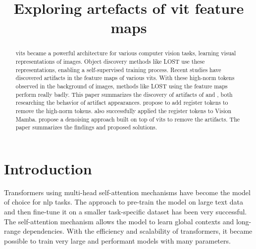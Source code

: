\documentclass[conference]{IEEEtran}
\begin{document}
  \title{Exploring artefacts of \acl{vit} feature maps}

  \author{
    }

  \maketitle

  \begin{abstract}
  \acfp{vit} became a powerful architecture for various computer vision tasks, learning visual representations of images. Object discovery methods like LOST \cite{lost} use these representations, enabling a self-supervised training process. Recent studies have discovered artifacts in the feature maps of various \acp{vit}. With these high-norm tokens observed in the background of images, methods like LOST using the feature maps perform really badly. This paper summarizes the discovery of artifacts of \citeauthor{registers} and \citeauthor{denoising}, both researching the behavior of artifact appearances. \citeauthor{registers} propose to add register tokens to remove the high-norm tokens. \citeauthor{mamba-needs-registers} also successfully applied the register tokens to Vision Mamba. \citeauthor{denoising} propose a denoising approach built on top of \acp{vit} to remove the artifacts. The paper summarizes the findings and proposed solutions.
  \end{abstract}


  \IEEEpeerreviewmaketitle

  \section{Introduction}
  \label{sec:introduction}

  Transformers \cite{transformer2017} using multi-head self-attention mechanisms have become the model of choice for \ac{nlp} tasks. The approach to pre-train the model on large text data and then fine-tune it on a smaller task-specific dataset has been very successful. The self-attention mechanism allows the model to learn global contexts and long-range dependencies. With the efficiency and scalability of transformers, it became possible to train very large and performant models with many parameters. \cite{transformer2017} \cite{visiontransformers2021} \cite{vit-state-challenges}
\end{document}
